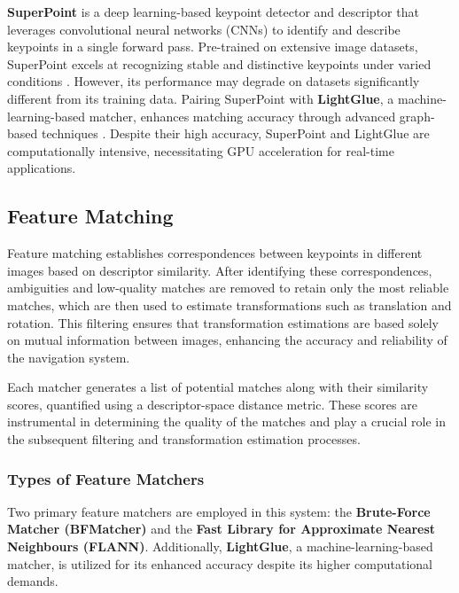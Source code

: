 \textbf{SuperPoint} is a deep learning-based keypoint detector and descriptor that leverages convolutional neural networks (CNNs) to identify and describe keypoints in a single forward pass. Pre-trained on extensive image datasets, SuperPoint excels at recognizing stable and distinctive keypoints under varied conditions \cite{rpaultrat2023superpoint}. However, its performance may degrade on datasets significantly different from its training data. Pairing SuperPoint with \textbf{LightGlue}, a machine-learning-based matcher, enhances matching accuracy through advanced graph-based techniques \cite{cvg2023lightglue}. Despite their high accuracy, SuperPoint and LightGlue are computationally intensive, necessitating GPU acceleration for real-time applications.





\subsection{Feature Matching}

Feature matching establishes correspondences between keypoints in different images based on descriptor similarity. After identifying these correspondences, ambiguities and low-quality matches are removed to retain only the most reliable matches, which are then used to estimate transformations such as translation and rotation. This filtering ensures that transformation estimations are based solely on mutual information between images, enhancing the accuracy and reliability of the navigation system.

Each matcher generates a list of potential matches along with their similarity scores, quantified using a descriptor-space distance metric. These scores are instrumental in determining the quality of the matches and play a crucial role in the subsequent filtering and transformation estimation processes.

\subsubsection{Types of Feature Matchers}

Two primary feature matchers are employed in this system: the \textbf{Brute-Force Matcher (BFMatcher)} and the \textbf{Fast Library for Approximate Nearest Neighbours (FLANN)}. Additionally, \textbf{LightGlue}, a machine-learning-based matcher, is utilized for its enhanced accuracy despite its higher computational demands.

